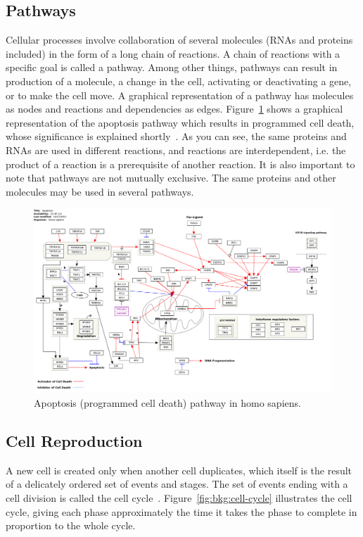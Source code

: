 \subsection{Pathways}
Cellular processes involve collaboration of several molecules (RNAs and proteins included) in the form of a long chain of reactions. A chain of reactions with a specific goal is called a pathway. Among other things, pathways can result in production of a molecule, a change in the cell, activating or deactivating a gene, or to make the cell move. A graphical representation of a pathway has molecules as nodes and reactions and dependencies as edges. Figure~\ref{fig:bkg:apoptosis-pathway} shows a graphical representation of the apoptosis pathway which results in programmed cell death, whose significance is explained shortly~\cite{bose2007p53, mott2007mir, lakin1999regulation, xiong2010effects, park2009mir}. As you can see, the same proteins and RNAs are used in different reactions, and reactions are interdependent, i.e. the product of a reaction is a prerequisite of another reaction. It is also important to note that pathways are not mutually exclusive. The same proteins and other molecules may be used in several pathways.

\begin{figure}[!ht]
  \centering
  \includegraphics[width=1\textwidth]{figs/background/apoptosis-pathway}
  \caption{Apoptosis (programmed cell death) pathway in homo sapiens.\protect\footnotemark}
  \label{fig:bkg:apoptosis-pathway}
\end{figure}

\subsection{Cell Reproduction}
A new cell is created only when another cell duplicates, which itself is the result of a delicately ordered set of events and stages. The set of events ending with a cell division is called the cell cycle~\cite[Ch. 17]{the-cell}. Figure~\ref{fig:bkg:cell-cycle} illustrates the cell cycle, giving each phase approximately the time it takes the phase to complete in proportion to the whole cycle. 

